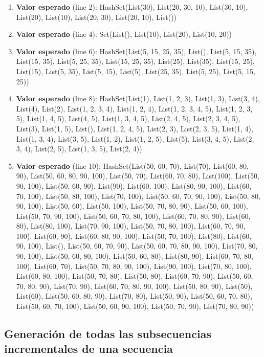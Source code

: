 \documentclass[12pt, a4paper]{article}
\begin{document}
\begin{enumerate}
  \item \textbf{Valor esperado} (line 2): HashSet(List(30), List(20, 30, 10), List(30, 10), List(20), List(10), List(20, 30), List(20, 10), List())
  \item \textbf{Valor esperado} (line 4): Set(List(), List(10), List(20), List(10, 20))
  \item \textbf{Valor esperado} (line 6): HashSet(List(5, 15, 25, 35), List(), List(5, 15, 35), List(15, 35), List(5, 25, 35), List(15, 25, 35), List(25), List(35), List(15, 25), List(15), List(5, 35), List(5, 15), List(5), List(25, 35), List(5, 25), List(5, 15, 25))
  \item \textbf{Valor esperado} (line 8): HashSet(List(1), List(1, 2, 3), List(1, 3), List(3, 4), List(4), List(2), List(1, 2, 3, 4), List(1, 2, 4), List(1, 2, 3, 4, 5), List(1, 2, 3, 5), List(1, 4, 5), List(4, 5), List(1, 3, 4, 5), List(2, 4, 5), List(2, 3, 4, 5), List(3), List(1, 5), List(), List(1, 2, 4, 5), List(2, 3), List(2, 3, 5), List(1, 4), List(1, 3, 4), List(3, 5), List(1, 2), List(1, 2, 5), List(5), List(3, 4, 5), List(2, 3, 4), List(2, 5), List(1, 3, 5), List(2, 4))
  \item \textbf{Valor esperado} (line 10): HashSet(List(50, 60, 70), List(70), List(60, 80, 90), List(50, 60, 80, 90, 100), List(50, 70), List(60, 70, 80), List(100), List(50, 90, 100), List(50, 60, 90), List(90), List(60, 100), List(80, 90, 100), List(60, 70, 100), List(50, 80, 100), List(70, 100), List(50, 60, 70, 90, 100), List(50, 80, 90, 100), List(50, 60), List(50, 100), List(50, 70, 80, 90), List(50, 60, 100), List(50, 70, 90, 100), List(50, 60, 70, 80, 100), List(60, 70, 80, 90), List(60, 80), List(80, 100), List(70, 90, 100), List(50, 70, 80, 100), List(60, 70, 90, 100), List(60, 90), List(60, 80, 90, 100), List(50, 70, 100), List(80), List(60, 90, 100), List(), List(50, 60, 70, 90), List(50, 60, 70, 80, 90, 100), List(70, 80, 90, 100), List(50, 60, 80, 100), List(50, 60, 80), List(80, 90), List(60, 70, 80, 100), List(60, 70), List(50, 70, 80, 90, 100), List(90, 100), List(70, 80, 100), List(60, 80, 100), List(50, 70, 80), List(50, 80), List(60, 70, 90), List(50, 60, 
  70, 80, 90), List(70, 90), List(60, 70, 80, 90, 100), List(50, 80, 90), List(50), List(60), List(50, 60, 80, 90), List(70, 80), List(50, 90), List(50, 60, 70, 80), List(50, 60, 70, 100), List(50, 60, 90, 100), List(50, 70, 90), List(70, 80, 90))
\end{enumerate}

\subsection{Generación de todas las subsecuencias incrementales de una secuencia}
\end{document}
